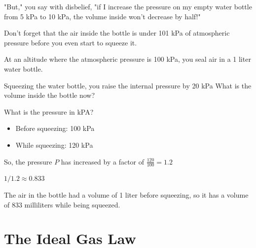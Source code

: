"But," you say with disbelief, "if I increase the pressure on my empty water bottle from 5 kPa to 10 kPa,  the volume inside won't decrease by half!"

Don't forget that the air inside the bottle is under 101 kPa of atmospheric pressure before you even start to squeeze it.

\begin{Exercise}[title={Temperature and Volume},  label=temp_vol]
  
At an altitude where the atmospheric pressure is 100 kPa,  you seal air in a 1 liter water bottle.

Squeezing the water bottle,  you raise the internal pressure by 20 kPa  What is the volume inside the bottle now?

\end{Exercise}
\begin{Answer}[ref=temp_vol]

What is the pressure in kPA?  
\begin{itemize}
\item Before squeezing: 100 kPa
\item While squeezing: 120 kPa
\end{itemize}

So, the pressure $P$ has increased by a factor of $\frac{120}{100} = 1.2$

$1/1.2 \approx 0.833$

The air in the bottle had a volume of 1 liter before squeezing, so it has a volume of 833 milliliters while being squeezed.

\end{Answer}

\section{The Ideal Gas Law}




